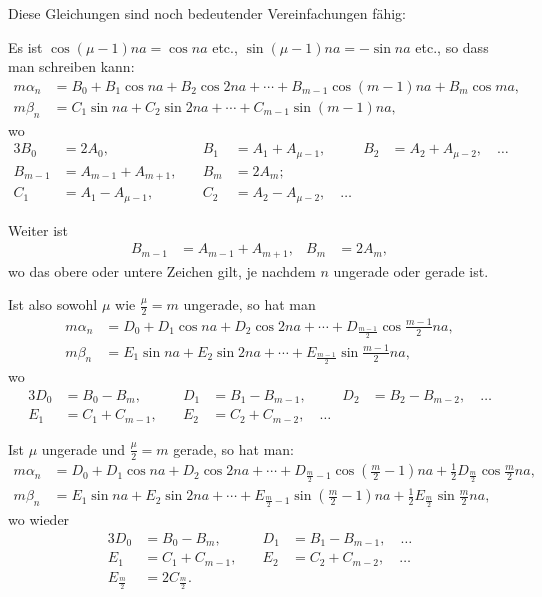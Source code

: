 \documentclass[12pt,a4paper]{article}
\begin{document}
Diese Gleichungen sind noch bedeutender Vereinfachungen fähig:

Es ist $\cos(\mu-1)na = \cos na$ etc., $\sin(\mu-1)na = -\sin na$ etc., so dass man schreiben kann:
\begin{align*}
m\alpha_n &= B_0 + B_1 \cos na + B_2 \cos 2na + \cdots + B_{m-1} \cos(m-1)na + B_m \cos ma,\\
m\beta_n &= C_1 \sin na + C_2 \sin 2na + \cdots + C_{m-1} \sin(m-1)na,
\end{align*}
wo
\begin{alignat*}{3}
B_0 &= 2A_0, \quad & B_1 &= A_1 + A_{\mu-1}, \quad & B_2 &= A_2 + A_{\mu-2}, \quad \ldots\\
B_{m-1} &= A_{m-1} + A_{m+1}, \quad & B_m &= 2A_m;\\
C_1 &= A_1 - A_{\mu-1}, \quad & C_2 &= A_2 - A_{\mu-2}, \quad \ldots
\end{alignat*}

Weiter ist
\begin{align*}
B_{m-1} &= A_{m-1} + A_{m+1}, & B_m &= 2A_m,
\end{align*}
wo das obere oder untere Zeichen gilt, je nachdem $n$ ungerade oder gerade ist.

\medskip
Ist also sowohl $\mu$ wie $\frac{\mu}{2} = m$ ungerade, so hat man
\begin{equation}
\tag{1}
\begin{aligned}
m\alpha_n &= D_0 + D_1 \cos na + D_2 \cos 2na + \cdots + D_{\frac{m-1}{2}} \cos\tfrac{m-1}{2}na,\\
m\beta_n &= E_1 \sin na + E_2 \sin 2na + \cdots + E_{\frac{m-1}{2}} \sin\tfrac{m-1}{2}na,
\end{aligned}
\end{equation}
wo
\begin{alignat*}{3}
D_0 &= B_0 - B_m, \quad & D_1 &= B_1 - B_{m-1}, \quad & D_2 &= B_2 - B_{m-2}, \quad \ldots\\
E_1 &= C_1 + C_{m-1}, \quad & E_2 &= C_2 + C_{m-2}, \quad \ldots
\end{alignat*}

Ist $\mu$ ungerade und $\frac{\mu}{2} = m$ gerade, so hat man:
\begin{equation}
\tag{2}
\begin{aligned}
m\alpha_n &= D_0 + D_1 \cos na + D_2 \cos 2na + \cdots + D_{\frac{m}{2}-1} \cos(\tfrac{m}{2}-1)na + \tfrac{1}{2}D_{\frac{m}{2}} \cos\tfrac{m}{2}na,\\
m\beta_n &= E_1 \sin na + E_2 \sin 2na + \cdots + E_{\frac{m}{2}-1} \sin(\tfrac{m}{2}-1)na + \tfrac{1}{2}E_{\frac{m}{2}} \sin\tfrac{m}{2}na,
\end{aligned}
\end{equation}
wo wieder
\begin{alignat*}{3}
D_0 &= B_0 - B_m, \quad & D_1 &= B_1 - B_{m-1}, \quad \ldots\\
E_1 &= C_1 + C_{m-1}, \quad & E_2 &= C_2 + C_{m-2}, \quad \ldots\\
E_{\frac{m}{2}} &= 2C_{\frac{m}{2}}.
\end{alignat*}
\end{document}
